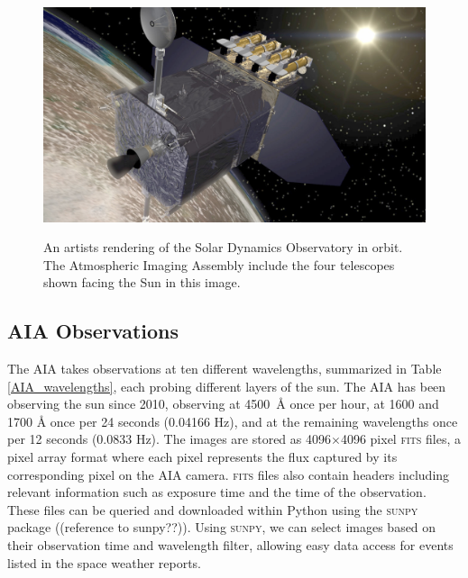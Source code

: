 \documentclass[12pt, letterpaper]{article}
\begin{document}
\begin{figure}[h!]
	\centering
	\includegraphics[width=\textwidth]{figures/sdo.jpg}
	\label{SDO}
	\caption{An artists rendering of the Solar Dynamics Observatory in orbit. The Atmospheric Imaging Assembly include the four telescopes shown facing the Sun in this image.}
\end{figure}

\subsection*{AIA Observations}

The AIA takes observations at ten different wavelengths, summarized in Table \ref{AIA_wavelengths}, each probing different layers of the sun. The AIA has been observing the sun since 2010, observing at 4500~Å once per hour, at 1600 and 1700 Å once per 24 seconds (0.04166 Hz), and at the remaining wavelengths once per 12 seconds (0.0833 Hz). The images are stored as 4096$\times$4096 pixel {\scshape fits} files, a pixel array format where each pixel represents the flux captured by its corresponding pixel on the AIA camera. {\scshape fits} files also contain headers including relevant information such as exposure time and the time of the observation. These files can be queried and downloaded within Python using the {\scshape sunpy} package ((reference to sunpy??)). Using {\scshape sunpy}, we can select images based on their observation time and wavelength filter, allowing easy data access for events listed in the space weather reports.
\end{document}
